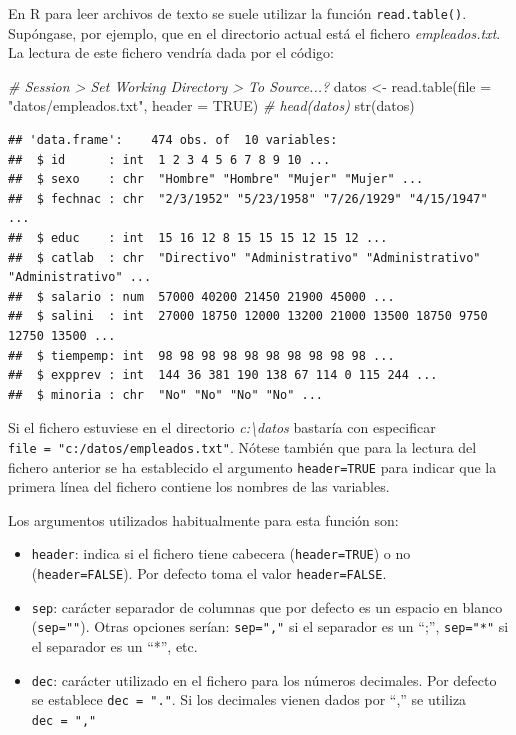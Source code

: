 \documentclass[
]{book}
\newenvironment{Shaded}{\begin{snugshade}}{\end{snugshade}}
\newcommand{\AttributeTok}[1]{\textcolor[rgb]{0.77,0.63,0.00}{#1}}
\newcommand{\CommentTok}[1]{\textcolor[rgb]{0.56,0.35,0.01}{\textit{#1}}}
\newcommand{\ConstantTok}[1]{\textcolor[rgb]{0.00,0.00,0.00}{#1}}
\newcommand{\FunctionTok}[1]{\textcolor[rgb]{0.00,0.00,0.00}{#1}}
\newcommand{\NormalTok}[1]{#1}
\newcommand{\OtherTok}[1]{\textcolor[rgb]{0.56,0.35,0.01}{#1}}
\newcommand{\StringTok}[1]{\textcolor[rgb]{0.31,0.60,0.02}{#1}}
\theoremstyle{break}
\begin{document}
En R para leer archivos de texto se suele utilizar la función \texttt{read.table()}.
Supóngase, por ejemplo, que en el directorio actual está el fichero
\emph{empleados.txt}. La lectura de este fichero vendría dada por el código:

\begin{Shaded}
\begin{Highlighting}[]
\CommentTok{\# Session \textgreater{} Set Working Directory \textgreater{} To Source...?}
\NormalTok{datos }\OtherTok{\textless{}{-}} \FunctionTok{read.table}\NormalTok{(}\AttributeTok{file =} \StringTok{"datos/empleados.txt"}\NormalTok{, }\AttributeTok{header =} \ConstantTok{TRUE}\NormalTok{)}
\CommentTok{\# head(datos)}
\FunctionTok{str}\NormalTok{(datos)}
\end{Highlighting}
\end{Shaded}

\begin{verbatim}
## 'data.frame':    474 obs. of  10 variables:
##  $ id      : int  1 2 3 4 5 6 7 8 9 10 ...
##  $ sexo    : chr  "Hombre" "Hombre" "Mujer" "Mujer" ...
##  $ fechnac : chr  "2/3/1952" "5/23/1958" "7/26/1929" "4/15/1947" ...
##  $ educ    : int  15 16 12 8 15 15 15 12 15 12 ...
##  $ catlab  : chr  "Directivo" "Administrativo" "Administrativo" "Administrativo" ...
##  $ salario : num  57000 40200 21450 21900 45000 ...
##  $ salini  : int  27000 18750 12000 13200 21000 13500 18750 9750 12750 13500 ...
##  $ tiempemp: int  98 98 98 98 98 98 98 98 98 98 ...
##  $ expprev : int  144 36 381 190 138 67 114 0 115 244 ...
##  $ minoria : chr  "No" "No" "No" "No" ...
\end{verbatim}

Si el fichero estuviese en el directorio \emph{c:\textbackslash datos} bastaría con especificar
\texttt{file\ =\ "c:/datos/empleados.txt"}.
Nótese también que para la lectura del fichero anterior se ha
establecido el argumento \texttt{header=TRUE} para indicar que la primera línea del
fichero contiene los nombres de las variables.

Los argumentos utilizados habitualmente para esta función son:

\begin{itemize}
\item
  \texttt{header}: indica si el fichero tiene cabecera (\texttt{header=TRUE}) o no
  (\texttt{header=FALSE}). Por defecto toma el valor \texttt{header=FALSE}.
\item
  \texttt{sep}: carácter separador de columnas que por defecto es un espacio
  en blanco (\texttt{sep=""}). Otras opciones serían: \texttt{sep=","} si el separador es
  un ``;'', \texttt{sep="*"} si el separador es un ``*'', etc.
\item
  \texttt{dec}: carácter utilizado en el fichero para los números decimales.
  Por defecto se establece \texttt{dec\ =\ "."}. Si los decimales vienen dados
  por ``,'' se utiliza \texttt{dec\ =\ ","}
\end{itemize}
\end{document}
